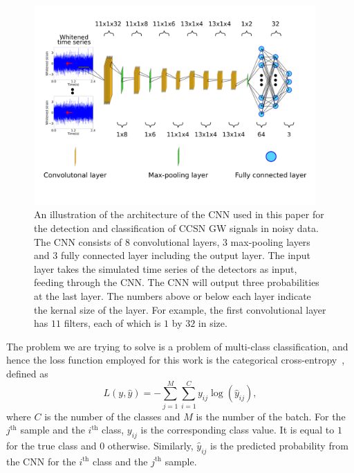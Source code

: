 \documentclass[aps,twocolumn,showpacs,groupedaddress, nofootinbib]{revtex4}  %
\begin{document}
\begin{figure}
\includegraphics[width=0.96\textwidth]{CNN2.png}
\caption{An illustration of the architecture of the \ac{CNN} used in this paper
for the detection and classification of \ac{CCSN} \ac{GW} signals in noisy data. The
\ac{CNN} consists of $8$ convolutional layers, $3$ max-pooling layers and $3$
fully connected layer including the output layer.  The input layer takes the
simulated time series of the detectors as input, feeding through the \ac{CNN}.
The \ac{CNN} will output three probabilities at the last layer.  The numbers
above or below each layer indicate the kernal size of the layer. For example,
the first convolutional layer has $11$ filters, each of which is $1$ by $32$ in
size.
\label{fig:CNN}}
\end{figure}
%
%

The problem we are trying to solve is a problem of multi-class
classification, and hence the loss function employed for this work is the
categorical cross-entropy~\cite{abadi2016tensorflow}, defined as
%
\begin{equation}\label{eq:cce}
 L(y,\hat{y}) = -\sum^M_{j=1}\sum^C_{i=1}y_{ij}\log(\hat{y}_{ij}),
\end{equation}
%
where $C$ is the number of the classes and $M$ is the number of the batch.
For the $j^{\text{th}}$ sample and the $i^{\text{th}}$ class, $y_{ij}$ is the corresponding class value. It is equal to $1$ for the
true class and $0$ otherwise.  Similarly, $\hat{y}_{ij}$ is the predicted
probability from the \ac{CNN} for the $i^{\text{th}}$ class and the $j^{\text{th}}$
sample.

\end{document}
